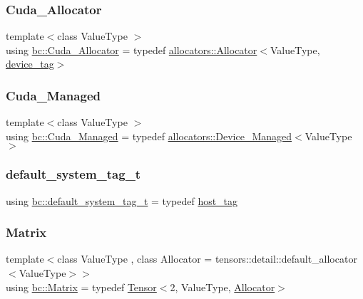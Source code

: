 \subsubsection{\texorpdfstring{Cuda\+\_\+\+Allocator}{Cuda\_Allocator}}
{\footnotesize\ttfamily template$<$class Value\+Type $>$ \\
using \hyperlink{namespacebc_a00a6f4634cf1568da58d6b30b25b2b7c}{bc\+::\+Cuda\+\_\+\+Allocator} = typedef \hyperlink{classbc_1_1allocators_1_1Allocator}{allocators\+::\+Allocator}$<$Value\+Type, \hyperlink{structbc_1_1device__tag}{device\+\_\+tag}$>$}

\mbox{\label{namespacebc_a1a27e2aeebe3c61abedd8fe9874a6ea8}} 
\subsubsection{\texorpdfstring{Cuda\+\_\+\+Managed}{Cuda\_Managed}}
{\footnotesize\ttfamily template$<$class Value\+Type $>$ \\
using \hyperlink{namespacebc_a1a27e2aeebe3c61abedd8fe9874a6ea8}{bc\+::\+Cuda\+\_\+\+Managed} = typedef \hyperlink{structbc_1_1allocators_1_1Device__Managed}{allocators\+::\+Device\+\_\+\+Managed}$<$Value\+Type$>$}

\mbox{\label{namespacebc_afc523ebfb2766ca065901d60e7f58ede}} 
\subsubsection{\texorpdfstring{default\+\_\+system\+\_\+tag\+\_\+t}{default\_system\_tag\_t}}
{\footnotesize\ttfamily using \hyperlink{namespacebc_afc523ebfb2766ca065901d60e7f58ede}{bc\+::default\+\_\+system\+\_\+tag\+\_\+t} = typedef \hyperlink{structbc_1_1host__tag}{host\+\_\+tag}}

\mbox{\label{namespacebc_a92dd1e243183b382432a5fac3ed8b89f}} 
\subsubsection{\texorpdfstring{Matrix}{Matrix}}
{\footnotesize\ttfamily template$<$class Value\+Type , class Allocator  = tensors\+::detail\+::default\+\_\+allocator$<$\+Value\+Type$>$$>$ \\
using \hyperlink{namespacebc_a92dd1e243183b382432a5fac3ed8b89f}{bc\+::\+Matrix} = typedef \hyperlink{namespacebc_a659391e47ab612be3ba6c18cf9c89159}{Tensor}$<$2, Value\+Type, \hyperlink{classbc_1_1allocators_1_1Allocator}{Allocator}$>$}

